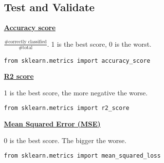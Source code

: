 \subsection{Test and Validate}
{\centering \underline{\textbf{Accuracy score}} \par}
$\frac{\# \text{correctly classified}}{\# \text{total}}$. 1 is the best score, 0 is the worst.
\begin{lstlisting}
from sklearn.metrics import accuracy_score
\end{lstlisting}

{\centering \underline{\textbf{R2 score}} \par}
1 is the best score, the more negative the worse.
\begin{lstlisting}
from sklearn.metrics import r2_score
\end{lstlisting}

{\centering \underline{\textbf{Mean Squared Error (MSE)}} \par}
0 is the best score. The bigger the worse.
\begin{lstlisting}
from sklearn.metrics import mean_squared_loss
\end{lstlisting}
